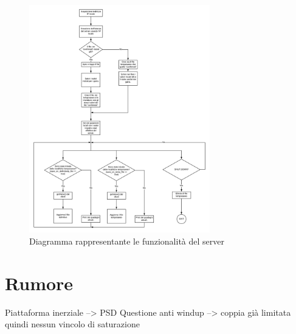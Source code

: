 \begin{figure}[h]
	\centering   	
	\includegraphics[width=0.7\textwidth]{Immagini/OPCUA_diagram.jpeg}
	\caption{Diagramma rappresentante le funzionalità del server}
	\label{fig:OPCUA_diagram}
\end{figure}

\chapter{Rumore}
Piattaforma inerziale --> PSD
Questione anti windup --> coppia già limitata quindi nessun vincolo di saturazione